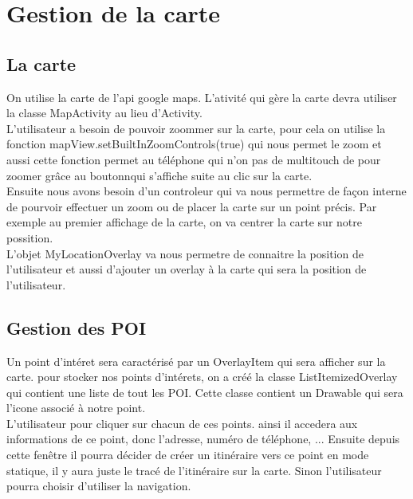 \chapter{Gestion de la carte}

\section{La carte}
On utilise la carte de l'api google maps. L'ativité qui gère la carte devra utiliser la classe MapActivity au lieu d'Activity.\\

L'utilisateur a besoin de pouvoir zoommer sur la carte, pour cela on utilise la fonction  mapView.setBuiltInZoomControls(true) qui nous permet le zoom et aussi cette fonction permet au téléphone qui n'on pas de multitouch de pour zoomer grâce au boutonnqui s'affiche suite au clic sur la carte. \\

Ensuite nous avons besoin d'un controleur qui va nous permettre de façon interne de pourvoir effectuer un zoom ou de placer la carte sur un point précis. Par exemple au premier affichage de la carte, on va centrer la carte sur notre possition. \\

L'objet MyLocationOverlay va nous permetre de connaitre la position de l'utilisateur et aussi d'ajouter un overlay à la carte qui sera la position de l'utilisateur. \\

\section{Gestion des POI}

Un point d'intéret sera caractérisé par un OverlayItem qui sera afficher sur la carte. pour stocker nos points d'intérets, on a créé la classe ListItemizedOverlay qui contient une liste de tout les POI. Cette classe contient un Drawable qui sera l'icone associé à notre point. \\

L'utilisateur pour cliquer sur chacun de ces points. ainsi il accedera aux informations de ce point, donc l'adresse, numéro de téléphone, ... Ensuite depuis cette fenêtre il pourra décider de créer un itinéraire vers ce point en mode statique, il y aura juste le tracé de l'itinéraire sur la carte. Sinon l'utilisateur pourra choisir d'utiliser la navigation. \\

 
